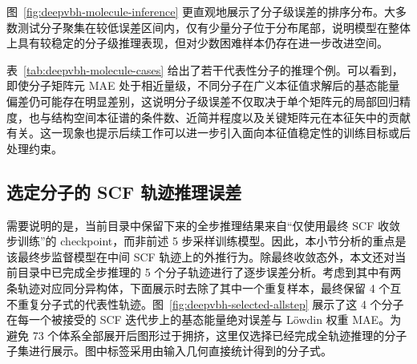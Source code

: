 图~\ref{fig:deepvbh-molecule-inference} 更直观地展示了分子级误差的排序分布。大多数测试分子聚集在较低误差区间内，仅有少量分子位于分布尾部，说明模型在整体上具有较稳定的分子级推理表现，但对少数困难样本仍存在进一步改进空间。

\begin{table}[htbp]
    \centering
    \caption{代表性测试分子的分子级推理结果示例}
    \label{tab:deepvbh-molecule-cases}
\end{table}

表~\ref{tab:deepvbh-molecule-cases} 给出了若干代表性分子的推理个例。可以看到，即使分子矩阵元 MAE 处于相近量级，不同分子在广义本征值求解后的基态能量偏差仍可能存在明显差别，这说明分子级误差不仅取决于单个矩阵元的局部回归精度，也与结构空间本征谱的条件数、近简并程度以及关键矩阵元在本征矢中的贡献有关。这一现象也提示后续工作可以进一步引入面向本征值稳定性的训练目标或后处理约束。

\subsection{选定分子的 SCF 轨迹推理误差}

需要说明的是，当前目录中保留下来的全步推理结果来自“仅使用最终 SCF 收敛步训练”的 checkpoint，而非前述 5 步采样训练模型。因此，本小节分析的重点是该最终步监督模型在中间 SCF 轨迹上的外推行为。除最终收敛态外，本文还对当前目录中已完成全步推理的 5 个分子轨迹进行了逐步误差分析。考虑到其中有两条轨迹对应同分异构体，下面展示时去除了其中一个重复样本，最终保留 4 个互不重复分子式的代表性轨迹。图~\ref{fig:deepvbh-selected-allstep} 展示了这 4 个分子在每一个被接受的 SCF 迭代步上的基态能量绝对误差与 Löwdin 权重 MAE。为避免 73 个体系全部展开后图形过于拥挤，这里仅选择已经完成全轨迹推理的分子子集进行展示。图中标签采用由输入几何直接统计得到的分子式。

